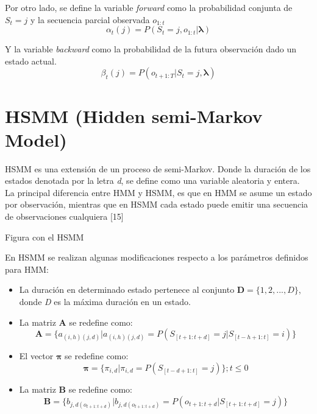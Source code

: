 Por otro lado, se define la variable \textit{forward} como la probabilidad conjunta de $S_{t}=j$ y la secuencia parcial observada $o_{1:t}$
\begin{equation}
\alpha_{t}(j) = P(S_{t} = j, o_{1:t} \vert \boldsymbol\lambda)
\end{equation}

Y la variable \textit{backward} como la probabilidad de la futura observaci\'on dado un estado actual.
\begin{equation}
\beta_{t}(j) = P(o_{t+1:T} \vert S_{t} = j, \boldsymbol\lambda)
\end{equation}


\section*{HSMM (Hidden semi-Markov Model) }

HSMM es una extensi\'on de un proceso de semi-Markov. Donde la duraci\'on de los estados denotada por la letra \textit{d}, se define como una variable aleatoria y entera. 
\\La principal diferencia entre HMM y HSMM, es que en HMM se asume un estado por observaci\'on, mientras que en HSMM cada estado puede emitir una secuencia de observaciones cualquiera [15]

Figura con el HSMM

En HSMM se realizan algunas modificaciones respecto a los par\'ametros definidos para HMM:

\begin{itemize}
\item La duraci\'on en determinado estado pertenece al conjunto $\textbf{D} = \lbrace 1,2,...,D \rbrace$, donde \textit{D} es la m\'axima duraci\'on en un estado.

\item La matriz \textbf{A} se redefine como: 
\begin{equation}
\textbf{A} = \lbrace a_{(i,h)(j,d)} \vert a_{(i,h)(j,d)} = P(S_{[t+1:t+d]} = j \vert S_{[t-h+1:t]} = i) \rbrace
\end{equation}

\item El vector $\boldsymbol\pi$ se redefine como:
\begin{equation}
\boldsymbol\pi = \lbrace \pi_{i,d} \vert \pi_{i,d} = P(S_{[t-d+1:t]} = j) \rbrace ; t \leqslant 0
\end{equation}

\item La matriz \textbf{B} se redefine como:
\begin{equation}
\textbf{B} = \lbrace b_{j,d(o_{t+1:t+d})} \vert b_{j,d(o_{t+1:t+d})} = P(o_{t+1:t+d} \vert S_{[t+1:t+d]} = j) \rbrace
\end{equation}

\end{itemize}

